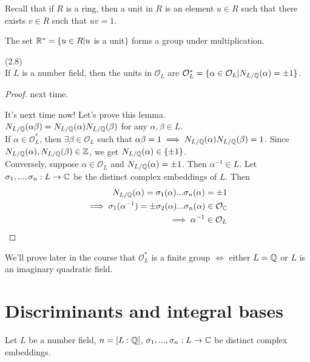 \documentclass[a4paper]{article}
\begin{document}
Recall that if $R$ is a ring, then a unit in $R$ is an element $u \in R$ such that there exists $v \in R$ such that $uv = 1$.

The set $\mathbb{R}^* = \{u \in R | u $ is a unit$\}$ forms a group under multiplication.

\begin{lemma} (2.8)\\
If $L$ is a number field, then the units in $\mathcal{O}_L$ are $\mathcal{O}_L^* = \{\alpha \in \mathcal{O}_L| N_{L/\mathbb{Q}}(\alpha) = \pm 1\}$.
\begin{proof}
next time.

It's next time now! Let's prove this lemma.\\
$N_{L/\mathbb{Q}}(\alpha\beta)=N_{L/\mathbb{Q}}(\alpha)N_{L/\mathbb{Q}}(\beta)$ for any $\alpha,\beta \in L$.\\
If $\alpha \in \mathcal{O}_L^*$, then $\exists \beta \in \mathcal{O}_L$ such that $\alpha\beta = 1 \implies N_{L/\mathbb{Q}}(\alpha) N_{L/\mathbb{Q}}(\beta) = 1$. Since $N_{L/\mathbb{Q}}(\alpha),N_{L/\mathbb{Q}}(\beta) \in \mathbb{Z}$, we get $N_{L/\mathbb{Q}}(\alpha) \in \{\pm 1\}$.\\
Conversely, suppose $\alpha \in \mathcal{O}_L$ and $N_{L/\mathbb{Q}} (\alpha) = \pm 1$. Then $\alpha^{-1} \in L$. Let $\sigma_1,...,\sigma_n:L \to \mathbb{C}$ be the distinct complex embeddings of $L$. Then 
\begin{equation*}
\begin{aligned}
N_{L/\mathbb{Q}}(\alpha) = \sigma_1(\alpha)...\sigma_n(\alpha) = \pm 1\\
\implies \sigma_1(\alpha^{-1}) = \pm \sigma_2(\alpha)...\sigma_n(\alpha) \in \mathcal{O}_{\mathbb{C}}\\
\implies \alpha^{-1} \in \mathcal{O}_L
\end{aligned}
\end{equation*}
\end{proof}
\end{lemma}

\begin{rem}
We'll prove later in the course that $\mathcal{O}_L^*$ is a finite group $\iff$ either $L=\mathbb{Q}$ or $L$ is an imaginary quadratic field.
\end{rem}

\newpage

\section{Discriminants and integral bases}
Let $L$ be a number field, $n=[L:\mathbb{Q}]$, $\sigma_1,...,\sigma_n:L \to \mathbb{C}$ be distinct complex embeddings.
\end{document}

